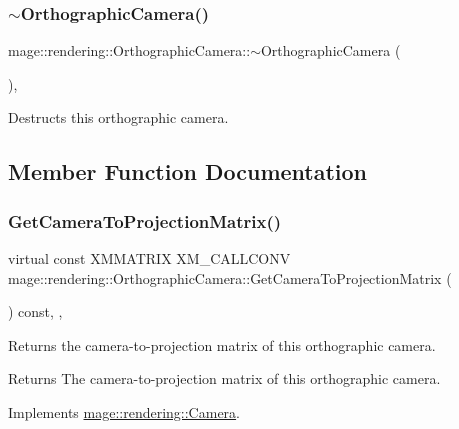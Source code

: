 \subsubsection{\texorpdfstring{$\sim$\+Orthographic\+Camera()}{~OrthographicCamera()}}
{\footnotesize\ttfamily mage\+::rendering\+::\+Orthographic\+Camera\+::$\sim$\+Orthographic\+Camera (\begin{DoxyParamCaption}{ }\end{DoxyParamCaption})\hspace{0.3cm}{\ttfamily [virtual]}, {\ttfamily [default]}}

Destructs this orthographic camera. 

\subsection{Member Function Documentation}
\hypertarget{classmage_1_1rendering_1_1_orthographic_camera_a45736d696df0a38c8f1342dca2cda0cd}{}\label{classmage_1_1rendering_1_1_orthographic_camera_a45736d696df0a38c8f1342dca2cda0cd} 
\subsubsection{\texorpdfstring{Get\+Camera\+To\+Projection\+Matrix()}{GetCameraToProjectionMatrix()}}
{\footnotesize\ttfamily virtual const X\+M\+M\+A\+T\+R\+IX X\+M\+\_\+\+C\+A\+L\+L\+C\+O\+NV mage\+::rendering\+::\+Orthographic\+Camera\+::\+Get\+Camera\+To\+Projection\+Matrix (\begin{DoxyParamCaption}{ }\end{DoxyParamCaption}) const\hspace{0.3cm}{\ttfamily [override]}, {\ttfamily [virtual]}, {\ttfamily [noexcept]}}

Returns the camera-\/to-\/projection matrix of this orthographic camera.

\begin{DoxyReturn}{Returns}
The camera-\/to-\/projection matrix of this orthographic camera. 
\end{DoxyReturn}


Implements \hyperlink{classmage_1_1rendering_1_1_camera_a08481175c3718a24333b22176e240d44}{mage\+::rendering\+::\+Camera}.


